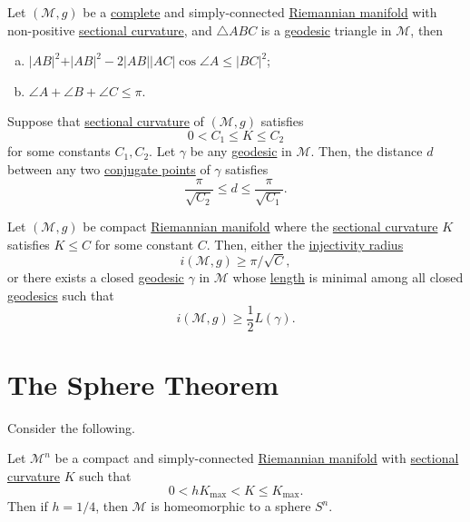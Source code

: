 \begin{corollary}
	Let \((\mathcal{M} , g )\) be a \hyperref[def:geodesically-complete]{complete} and simply-connected \hyperref[def:Riemannian-manifold]{Riemannian manifold} with non-positive \hyperref[def:sectional-curvature]{sectional curvature}, and \(\triangle ABC\) is a \hyperref[def:geodesic]{geodesic} triangle in \(\mathcal{M} \), then
	\begin{enumerate}[(a)]
		\item \(\vert AB \vert ^2 + \vert AB \vert ^2 - 2 \vert AB \vert \vert AC \vert \cos \angle A \leq \vert BC \vert ^2\);
		\item \(\angle A + \angle B + \angle C \leq \pi \).
	\end{enumerate}
\end{corollary}

\begin{corollary}
	Suppose that \hyperref[def:sectional-curvature]{sectional curvature} of \((\mathcal{M} , g)\) satisfies
	\[
		0 < C_1 \leq K \leq C_2
	\]
	for some constants \(C_1, C_2\). Let \(\gamma \) be any \hyperref[def:geodesic]{geodesic} in \(\mathcal{M} \). Then, the distance \(d\) between any two \hyperref[def:conjugate-point]{conjugate points} of \(\gamma \) satisfies
	\[
		\frac{\pi}{\sqrt{C_2} } \leq d \leq \frac{\pi }{\sqrt{C_1} }.
	\]
\end{corollary}

\begin{corollary}
	Let \((\mathcal{M} , g)\) be compact \hyperref[def:Riemannian-manifold]{Riemannian manifold} where the \hyperref[def:sectional-curvature]{sectional curvature} \(K\) satisfies \(K \leq C\) for some constant \(C\). Then, either the \hyperref[def:injectivity-radius]{injectivity radius}
	\[
		i(\mathcal{M} , g) \geq \pi / \sqrt{C},
	\]
	or there exists a closed \hyperref[def:geodesic]{geodesic} \(\gamma \) in \(\mathcal{M} \) whose \hyperref[def:length]{length} is  minimal among all closed \hyperref[def:geodesic]{geodesics} such that
	\[
		i(\mathcal{M} , g) \geq \frac{1}{2} L(\gamma ).
	\]
\end{corollary}

\section{The Sphere Theorem}
Consider the following.

\begin{theorem}\label{thm:sphere}
	Let \(\mathcal{M} ^n\) be a compact and simply-connected \hyperref[def:Riemannian-manifold]{Riemannian manifold} with \hyperref[def:sectional-curvature]{sectional curvature} \(K\) such that
	\[
		0 < h K_{\max } < K \leq K_{\max } .
	\]
	Then if \(h = 1 / 4\), then \(\mathcal{M} \) is homeomorphic to a sphere \(S^n\).
\end{theorem}

